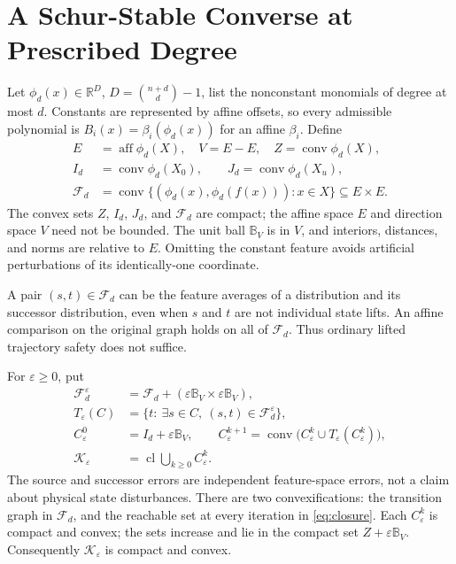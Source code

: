 \documentclass[journal,10pt]{IEEEtran}
\theoremstyle{definition}\newtheorem{definition}{Definition}
\theoremstyle{remark}
\newcommand{\R}{\mathbb R}
\newcommand{\co}{\operatorname{conv}}
\newcommand{\cl}{\operatorname{cl}}
\newcommand{\ball}{\mathbb B_V}
\newcommand{\F}{\mathcal F_d}
\begin{document}
\section{A Schur-Stable Converse at Prescribed Degree}\label{sec:converse}
Let $\phi_d(x)\in\R^D$, $D=\binom{n+d}{d}-1$, list the nonconstant monomials of degree at most $d$. Constants are represented by affine offsets, so every admissible polynomial is $B_i(x)=\beta_i(\phi_d(x))$ for an affine $\beta_i$. Define
\begin{align}
 E&=\operatorname{aff}\phi_d(X),\quad V=E-E,\quad
 Z=\co\phi_d(X),\nonumber\\
 I_d&=\co\phi_d(X_0),\qquad J_d=\co\phi_d(X_u),\label{eq:features}\\
 \F&=\co\{(\phi_d(x),\phi_d(f(x))):x\in X\}\subseteq E\times E.\nonumber
\end{align}
The convex sets $Z$, $I_d$, $J_d$, and $\F$ are compact; the affine space $E$ and direction space $V$ need not be bounded. The unit ball $\ball$ is in $V$, and interiors, distances, and norms are relative to $E$. Omitting the constant feature avoids artificial perturbations of its identically-one coordinate.

A pair $(s,t)\in\F$ can be the feature averages of a distribution and its successor distribution, even when $s$ and $t$ are not individual state lifts. An affine comparison on the original graph holds on all of $\F$. Thus ordinary lifted trajectory safety does not suffice.

For $\varepsilon\geq0$, put
\begin{align}
 \mathcal F_d^\varepsilon&=\F+(\varepsilon\ball\times\varepsilon\ball),\nonumber\\
 T_\varepsilon(C)&=\{t:\ \exists s\in C,\ (s,t)\in\mathcal F_d^\varepsilon\},\nonumber\\
 C_\varepsilon^0&=I_d+\varepsilon\ball,\qquad
 C_\varepsilon^{k+1}=\co\bigl(C_\varepsilon^k\cup T_\varepsilon(C_\varepsilon^k)\bigr),\label{eq:closure}\\
 \mathcal K_\varepsilon&=\cl\bigcup_{k\geq0}C_\varepsilon^k.\nonumber
\end{align}
The source and successor errors are independent feature-space errors, not a claim about physical state disturbances. There are two convexifications: the transition graph in $\F$, and the reachable set at every iteration in \eqref{eq:closure}. Each $C_\varepsilon^k$ is compact and convex; the sets increase and lie in the compact set $Z+\varepsilon\ball$. Consequently $\mathcal K_\varepsilon$ is compact and convex.
\end{document}
